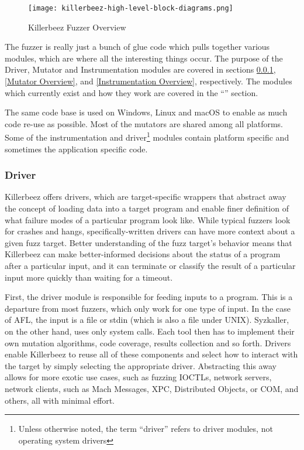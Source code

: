 \begin{figure}[hp]
\centering
\texttt{[image: killerbeez-high-level-block-diagrams.png]}
\caption{Killerbeez Fuzzer Overview}
\label{fig:Killerbeez-fuzzer-overview}
\end{figure}
\begin{multicols}{2}

The fuzzer is really just a bunch of glue code which pulls together various
modules, which are where all the interesting things occur. The purpose of
the Driver, Mutator and Instrumentation modules are covered in sections
\ref{Driver Overview}, \ref{Mutator Overview}, and
\ref{Instrumentation Overview}, respectively.  The modules which currently
exist and how they work are covered in the ``''
section.

The same code base is used on Windows, Linux and macOS to enable as much code
re-use as possible.  Most of the mutators are shared among all platforms.
Some of the instrumentation and driver\footnote{Unless otherwise noted,
the term ``driver'' refers to driver modules, not operating system drivers}
modules contain platform specific and sometimes the application specific code.

\subsubsection{Driver} \label{Driver Overview}
Killerbeez offers drivers, which are target-specific wrappers that abstract
away the concept of loading data into a target program and enable finer
definition of what failure modes of a particular program look like. While
typical fuzzers look for crashes and hangs, specifically-written drivers can
have more context about a given fuzz target.  Better understanding of the fuzz
target's behavior means that Killerbeez can make better-informed decisions
about the status of a program after a particular input, and it can terminate or
classify the result of a particular input more quickly than waiting for a
timeout.

First, the driver module is responsible for feeding inputs to a program.  This
is a departure from most fuzzers, which only work for one type of input.  In
the case of AFL, the input is a file or stdin (which is also a file under
UNIX).  Syzkaller\cite{syzkaller}, on the other hand, uses only system calls.
Each tool then has to implement their own mutation algorithms, code coverage,
results collection and so forth. Drivers enable Killerbeez to reuse all of
these components and select how to interact with the target by simply selecting
the appropriate driver.  Abstracting this away allows for more exotic use
cases, such as fuzzing IOCTLs, network servers, network clients, \IPC{} such as
Mach Messages, XPC, Distributed Objects, or COM, and others, all with minimal
effort.


\end{multicols}

